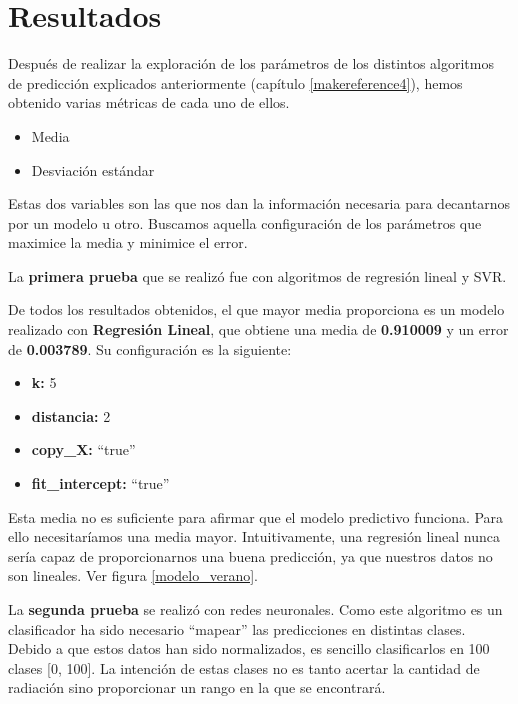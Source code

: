 \cleardoublepage

\chapter{Resultados}
\label{makereference6}

Después de realizar la exploración de los parámetros de los distintos algoritmos de predicción explicados anteriormente (capítulo \ref{makereference4}), hemos obtenido varias métricas de cada uno de ellos.

\begin{itemize}
	\item Media
	\item Desviación estándar
\end{itemize}

Estas dos variables son las que nos dan la información necesaria para decantarnos por un modelo u otro. Buscamos aquella configuración de los parámetros que maximice la media y minimice el error.

La \textbf{primera prueba} que se realizó fue con algoritmos de regresión lineal y SVR.

De todos los resultados obtenidos, el que mayor media proporciona es un modelo realizado con \textbf{Regresión Lineal}, que obtiene una media de \textbf{0.910009} y un error de \textbf{0.003789}. Su configuración es la siguiente:

\begin{itemize}
	\item \textbf{k:} 5
	\item \textbf{distancia:} 2
	\item \textbf{copy\_X:} ``true''
	\item \textbf{fit\_intercept:} ``true''
\end{itemize}

Esta media no es suficiente para afirmar que el modelo predictivo funciona. Para ello necesitaríamos una media mayor. Intuitivamente, una regresión lineal nunca sería capaz de proporcionarnos una buena predicción, ya que nuestros datos no son lineales. Ver figura \ref{modelo_verano}.

La \textbf{segunda prueba} se realizó con redes neuronales. Como este algoritmo es un clasificador ha sido necesario ``mapear'' las predicciones en distintas clases. Debido a que estos datos han sido normalizados, es sencillo clasificarlos en 100 clases [0, 100]. La intención de estas clases no es tanto acertar la cantidad de radiación sino proporcionar un rango en la que se encontrará.

